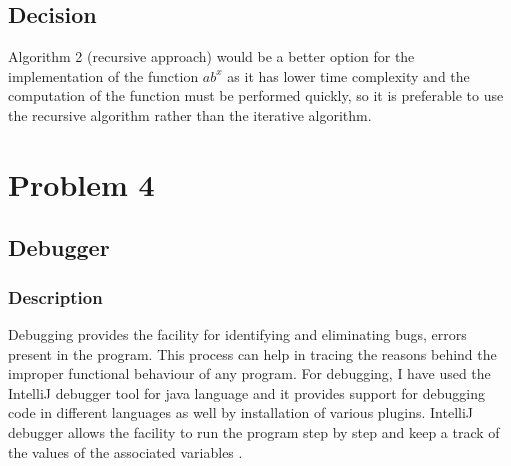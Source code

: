 \documentclass[12pt, a4paper]{article}
\begin{document}
\subsection*{Decision}
Algorithm 2 (recursive approach) would be a better option for the implementation of the function $ab^x$ as it has lower time complexity and the computation of the function must be performed quickly, so it is preferable to use the recursive algorithm rather than the iterative algorithm.

\newpage


\section{Problem 4 }
\subsection{Debugger}
\subsubsection{Description}
Debugging provides the facility for identifying and eliminating bugs, errors present in the program. This process can help in tracing the reasons behind the improper functional behaviour of any program. For debugging, I have used the IntelliJ debugger tool for java language and it provides support for debugging code in different languages as well by installation of various plugins. IntelliJ debugger allows the facility to run the program step by step and keep a track of the values of the associated variables \cite{IntelliJ Debugger}.
\end{document}
